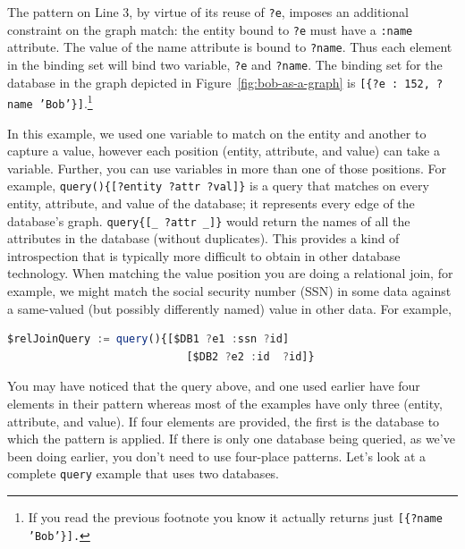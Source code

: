 \documentclass[10pt,letterpaper]{article} %
\newcommand{\stt}[1]{\texttt{#1}} %
\begin{document}
The pattern on Line 3, by virtue of its reuse of \stt{?e}, imposes an additional constraint on the graph match: the entity bound to \stt{?e} must have a \stt{:name} attribute.
The value of the name attribute is bound to \stt{?name}.
Thus each element in the binding set will bind two variable, \stt{?e} and \stt{?name}.
The binding set for the database in the graph depicted in Figure~\ref{fig:bob-as-a-graph} is \stt{[\{?e : 152, ?name 'Bob'\}]}.\footnote{If you read the previous footnote you know it actually returns just \stt{[\{?name 'Bob'\}].}}

In this example, we used one variable to match on the entity and another to capture a value, however each position (entity, attribute, and value) can take a variable.
Further, you can use variables in more than one of those positions.
For example, \stt{query()\{[?entity ?attr ?val]\}} is a query that matches on every entity, attribute, and value of the database; it represents every edge of the database's graph.
\stt{query\{[\_ ?attr \_]\}} would return the names of all the attributes in the database (without duplicates). %
This provides a kind of introspection that is typically more difficult to obtain in other database technology.
When matching the value position you are doing a relational join, for example, we might match the social security number (SSN) in
some data against a same-valued (but possibly differently named) value in other data.
For example,

\begin{lstlisting}[language=JavaScript,numbers=none,basicstyle=\ttfamily\scriptsize]
   $relJoinQuery := query(){[$DB1 ?e1 :ssn ?id]
                            [$DB2 ?e2 :id  ?id]}
\end{lstlisting} \vspace{-2em}

You may have noticed that the query above, and one used earlier have four elements in their pattern whereas most of the examples have only three (entity, attribute, and value).
If four elements are provided, the first is the database to which the pattern is applied.
If there is only one database being queried, as we've been doing earlier, you don't need to use four-place patterns.
Let's look at a complete \stt{query} example that uses two databases.
\end{document}

